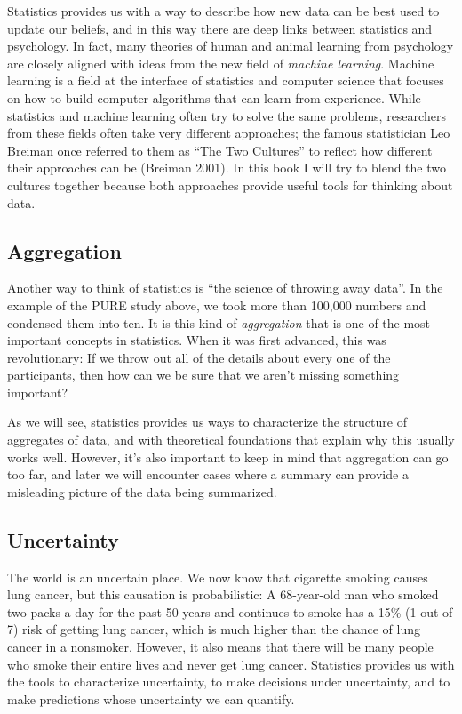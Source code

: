 \documentclass[]{book}
\theoremstyle{definition}
\theoremstyle{definition}
\theoremstyle{definition}
\theoremstyle{remark}
\begin{document}
Statistics provides us with a way to describe how new data can be best
used to update our beliefs, and in this way there are deep links between
statistics and psychology. In fact, many theories of human and animal
learning from psychology are closely aligned with ideas from the new
field of \emph{machine learning}. Machine learning is a field at the
interface of statistics and computer science that focuses on how to
build computer algorithms that can learn from experience. While
statistics and machine learning often try to solve the same problems,
researchers from these fields often take very different approaches; the
famous statistician Leo Breiman once referred to them as ``The Two
Cultures'' to reflect how different their approaches can be (Breiman
2001). In this book I will try to blend the two cultures together
because both approaches provide useful tools for thinking about data.

\subsection{Aggregation}\label{aggregation}

Another way to think of statistics is ``the science of throwing away
data''. In the example of the PURE study above, we took more than
100,000 numbers and condensed them into ten. It is this kind of
\emph{aggregation} that is one of the most important concepts in
statistics. When it was first advanced, this was revolutionary: If we
throw out all of the details about every one of the participants, then
how can we be sure that we aren't missing something important?

As we will see, statistics provides us ways to characterize the
structure of aggregates of data, and with theoretical foundations that
explain why this usually works well. However, it's also important to
keep in mind that aggregation can go too far, and later we will
encounter cases where a summary can provide a misleading picture of the
data being summarized.

\subsection{Uncertainty}\label{uncertainty}

The world is an uncertain place. We now know that cigarette smoking
causes lung cancer, but this causation is probabilistic: A 68-year-old
man who smoked two packs a day for the past 50 years and continues to
smoke has a 15\% (1 out of 7) risk of getting lung cancer, which is much
higher than the chance of lung cancer in a nonsmoker. However, it also
means that there will be many people who smoke their entire lives and
never get lung cancer. Statistics provides us with the tools to
characterize uncertainty, to make decisions under uncertainty, and to
make predictions whose uncertainty we can quantify.
\end{document}
